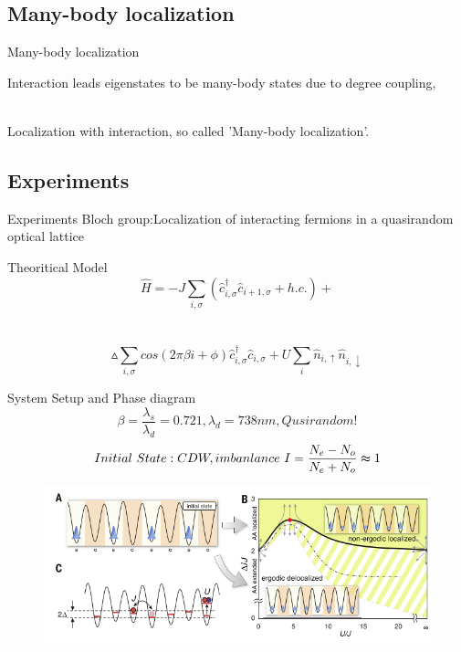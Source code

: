 \documentclass{beamer}
\begin{document}
\subsection{Many-body localization}
\begin{frame}{Many-body localization}

Interaction leads eigenstates to be many-body states due to degree coupling,\\~

Localization with interaction, so called 'Many-body localization'.

\end{frame}
\subsection{Experiments}
\begin{frame}{Experiments}
Bloch group:Localization of interacting fermions in a quasirandom optical lattice
\begin{block}{Theoritical Model}
$$\hat{H}=-J\sum_{i,\sigma}(\hat{c}_{i,\sigma}^{\dagger}\hat{c}_{i+1,\sigma}+h.c.)+$$\\~
$$\vartriangle \sum_{i,\sigma}cos(2\pi\beta i+\phi)\hat{c}_{i,\sigma}^{\dagger}\hat{c}_{i,\sigma}+U\sum_{i}\hat{n}_{i,\uparrow}\hat{n}_{i,\downarrow}$$
\end{block}
\end{frame}

\begin{frame}{System Setup and Phase diagram}
$$\beta=\frac{\lambda_s}{\lambda_d}=0.721,\lambda_d= 738nm,Qusirandom!$$
$$Initial\ State:CDW,imbanlance\ I=\frac{N_e-N_o}{N_e+N_o}\thickapprox1 $$
\begin{figure}
\includegraphics[width=1\linewidth]{Phasediagram}
\end{figure}
\end{frame}
\end{document}
